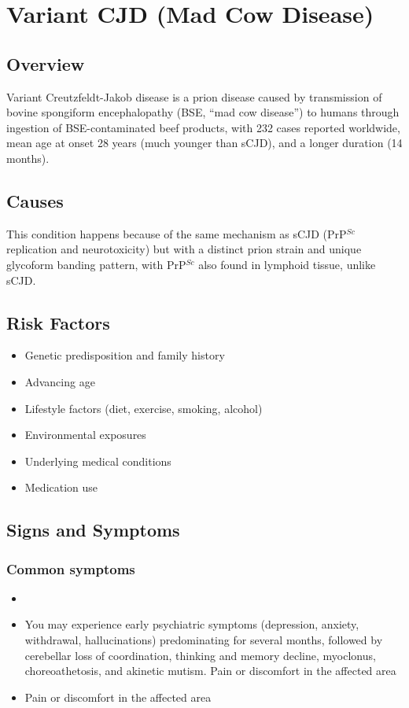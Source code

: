\chapter{Variant CJD (Mad Cow Disease)}
\label{sec:Variant CJD}

\section{Overview}
Variant Creutzfeldt-Jakob disease is a prion disease caused by transmission of bovine spongiform encephalopathy (BSE, ``mad cow disease'') to humans through ingestion of BSE-contaminated beef products, with 232 cases reported worldwide, mean age at onset 28 years (much younger than sCJD), and a longer duration (14 months).
\section{Causes}
This condition happens because of the same mechanism as sCJD (PrP$^{Sc}$ replication and neurotoxicity) but with a distinct prion strain and unique glycoform banding pattern, with PrP$^{Sc}$ also found in lymphoid tissue, unlike sCJD.     
\section{Risk Factors}

\begin{itemize}[noitemsep]
  \item Genetic predisposition and family history
  \item Advancing age
  \item Lifestyle factors (diet, exercise, smoking, alcohol)
  \item Environmental exposures
  \item Underlying medical conditions
  \item Medication use
\end{itemize}
\section{Signs and Symptoms}

\subsection{Common symptoms}
\begin{itemize}[noitemsep]
  \item \item You may experience early psychiatric symptoms (depression, anxiety, withdrawal, hallucinations) predominating for several months, followed by cerebellar loss of coordination, thinking and memory decline, myoclonus, choreoathetosis, and akinetic mutism. Pain or discomfort in the affected area    \item Pain or discomfort in the affected area
  \end{itemize}

